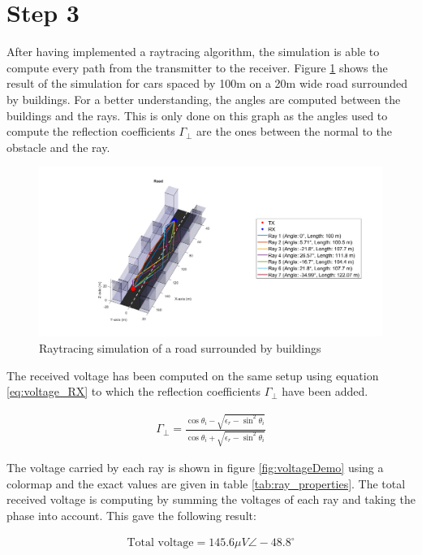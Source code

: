 \documentclass[10pt,a4paper]{ULBreport}
\begin{document}
\section{Step 3}

After having implemented a raytracing algorithm, the simulation is able to compute every path from the transmitter to the receiver. Figure \ref{fig:raytracingDemo} shows the result of the simulation for cars spaced by 100m on a 20m wide road surrounded by buildings. For a better understanding, the angles are computed between the buildings and the rays. This is only done on this graph as the angles used to compute the reflection coefficients $\Gamma_{\perp}$ are the ones between the normal to the obstacle and the ray.

\begin{figure}[H]
    \centering
    \includegraphics[width=1\textwidth]{3_1.png}
    \caption{Raytracing simulation of a road surrounded by buildings}
    \label{fig:raytracingDemo}
\end{figure}

The received voltage has been computed on the same setup using equation \ref{eq:voltage_RX} to which the reflection coefficients $\Gamma_{\perp}$ have been added. 

\begin{align*}
    \Gamma_{\perp} = \frac{\cos \theta_i - \sqrt{\epsilon_r-\sin^2\theta_i}}{\cos \theta_i + \sqrt{\epsilon_r-\sin^2\theta_i}}
\end{align*}

The voltage carried by each ray is shown in figure \ref{fig:voltageDemo} using a colormap and the exact values are given in table \ref{tab:ray_properties}. The total received voltage is computing by summing the voltages of each ray and taking the phase into account. This gave the following result:

\begin{align*}
    \text{Total voltage} = 145.6 \mu V \angle -48.8^\circ
\end{align*}
\end{document}
